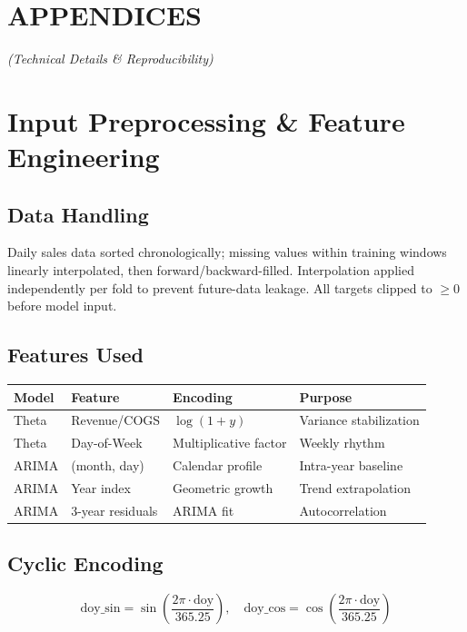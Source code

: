 \documentclass[12pt,a4paper]{article}
\begin{document}
\newpage

\section*{\Large \textbf{APPENDICES}}
\textit{(Technical Details \& Reproducibility)}

\appendix

\section{Input Preprocessing \& Feature Engineering}

\subsection{Data Handling}

Daily sales data sorted chronologically; missing values within training windows linearly interpolated, then forward/backward-filled. Interpolation applied independently per fold to prevent future-data leakage. All targets clipped to $\geq 0$ before model input.

\subsection{Features Used}

\begin{table}[h!]
\centering
\small
\begin{tabular}{llll}
\toprule
\textbf{Model} & \textbf{Feature} & \textbf{Encoding} & \textbf{Purpose} \\
\midrule
Theta & Revenue/COGS & $\log(1+y)$ & Variance stabilization \\
Theta & Day-of-Week & Multiplicative factor & Weekly rhythm \\
ARIMA & (month, day) & Calendar profile & Intra-year baseline \\
ARIMA & Year index & Geometric growth & Trend extrapolation \\
ARIMA & 3-year residuals & ARIMA fit & Autocorrelation \\
\bottomrule
\end{tabular}
\end{table}

\subsection{Cyclic Encoding}

\[
\text{doy\_sin} = \sin\left(\frac{2\pi \cdot \text{doy}}{365.25}\right), \quad
\text{doy\_cos} = \cos\left(\frac{2\pi \cdot \text{doy}}{365.25}\right)
\]
\end{document}
